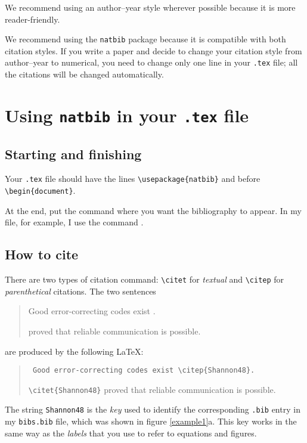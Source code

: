 \documentclass[11pt]{article}
\begin{document}
 We recommend using an author--year style wherever possible
 because  it is   more reader-friendly. 

 We recommend using the {\tt{natbib}} package
 because 
 it is compatible  with both  citation styles.
 If you write a  paper and decide to change your citation style
 from author--year to numerical, 
 you need to change only one line in your {\tt{.tex}} file;
  all the citations will be changed automatically.

\section{Using {\tt{natbib}}  in your {\tt{.tex}} file}
\subsection{Starting and finishing}
 Your  {\tt{.tex}}  file should have
 the lines 
 {\verb+\usepackage{natbib}+} 
 and 
 {\verb++} 
 before  
 {\verb+\begin{document}+}.

 At the end, put the command {\verb++}
 where you want the bibliography
 to appear. In my file, for example,  I use the command 
 {\verb++}.

\subsection{How to cite}
 There are two types of  citation command: 
 {\verb+\citet+} for {\em textual\/}
 and
  {\verb+\citep+} for
  {\em parenthetical\/} citations. 
 The two sentences
\begin{quote}
  Good error-correcting codes exist \citep{Shannon48}.

  \citet{Shannon48} proved that reliable communication is possible. 
\end{quote}
 are produced by the following \LaTeX:
\begin{quote}
\tt
  Good error-correcting codes exist \verb+\citep{Shannon48}+.

  \verb+\citet{Shannon48}+ proved that reliable communication is possible. 
\end{quote}
 The string {\tt{Shannon48}} is the  {\em{key}\/} used to identify the 
 corresponding {\tt{.bib}} entry in my {\tt{bibs.bib}} file, 
 which was shown in figure \ref{example1}a.
 This key works in the same way as the {\em labels\/} that you use
 to refer to equations and figures. 
\end{document}
